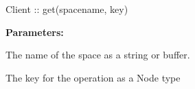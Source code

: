 %
%
%


\subsubsection{}
\label{api:nodejs:get}
\begin{javascriptcode}
Client :: get(spacename, key)
\end{javascriptcode}
\funcdesc 

\noindent\textbf{Parameters:}
\begin{description}[labelindent=\widthof{{\code{spacename}}},leftmargin=*,noitemsep,nolistsep,align=right]
\item[\code{spacename}] The name of the space as a string or buffer.
\item[\code{key}] The key for the operation as a Node type
\end{description}

